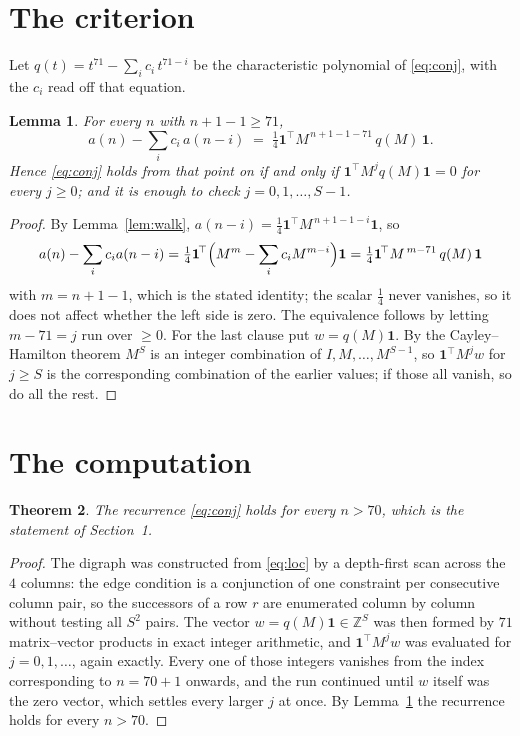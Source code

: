 \documentclass[11pt,a4paper]{article}
\theoremstyle{plain}
\newtheorem{theorem}{Theorem}
\newtheorem{lemma}[theorem]{Lemma}
\theoremstyle{definition}
\begin{document}
\section{The criterion}

Let $q(t)=t^{71}-\sum_i c_i\,t^{71-i}$ be the characteristic polynomial of
\eqref{eq:conj}, with the $c_i$ read off that equation.

\begin{lemma}\label{lem:crit}
For every $n$ with $n+1-1\ge71$,
\[
a(n)-\sum_i c_i\,a(n-i)\;=\;\tfrac1{4}\mathbf{1}^{\!\top}M^{\,n+1-1-71}\,q(M)\,\mathbf{1} .
\]
Hence \eqref{eq:conj} holds from that point on if and only if
$\mathbf{1}^{\!\top}M^{j}q(M)\mathbf{1}=0$ for every $j\ge0$; and it is enough to check
$j=0,1,\dots,S-1$.
\end{lemma}

\begin{proof}
By Lemma~\ref{lem:walk}, $a(n-i)=\tfrac1{4}\mathbf{1}^{\!\top}M^{\,n+1-1-i}\mathbf{1}$, so
\[
a(n)-\sum_i c_i a(n-i)
=\tfrac1{4}\mathbf{1}^{\!\top}\Bigl(M^{m}-\sum_i c_i M^{m-i}\Bigr)\mathbf{1}
=\tfrac1{4}\mathbf{1}^{\!\top}M^{\,m-71}\,q(M)\,\mathbf{1}
\]
with $m=n+1-1$, which is the stated identity; the scalar $\tfrac1{4}$ never vanishes, so
it does not affect whether the left side is zero. The equivalence follows by letting
$m-71=j$ run over $\ge0$. For the last clause put $w=q(M)\mathbf{1}$. By the
Cayley--Hamilton theorem $M^{S}$ is an integer combination of $I,M,\dots,M^{S-1}$, so
$\mathbf{1}^{\!\top}M^{j}w$ for $j\ge S$ is the corresponding combination of the earlier
values; if those all vanish, so do all the rest.
\end{proof}

\section{The computation}

\begin{theorem}
The recurrence \eqref{eq:conj} holds for every $n>70$, which is the statement of
Section~1.
\end{theorem}

\begin{proof}
The digraph was constructed from \eqref{eq:loc} by a depth-first scan across the $4$
columns: the edge condition is a conjunction of one constraint per consecutive column
pair, so the successors of a row $r$ are enumerated column by column without testing all
$S^2$ pairs. The vector $w=q(M)\mathbf{1}\in\mathbb{Z}^{S}$ was then formed by $71$
matrix--vector products in exact integer arithmetic, and $\mathbf{1}^{\!\top}M^{j}w$ was
evaluated for $j=0,1,\dots$, again exactly. Every one of those integers vanishes from the
index corresponding to $n=70+1$ onwards, and the run continued until $w$ itself was the
zero vector, which settles every larger $j$ at once. By Lemma~\ref{lem:crit} the recurrence
holds for every $n>70$.
\end{proof}
\end{document}
